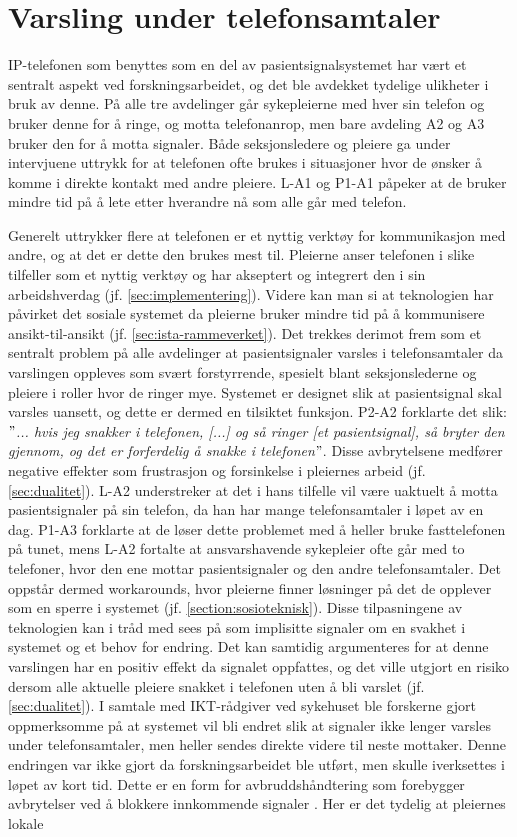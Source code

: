 \section{Varsling under telefonsamtaler}
IP-telefonen som benyttes som en del av pasientsignalsystemet har vært et sentralt aspekt ved forskningsarbeidet, og det ble avdekket tydelige ulikheter i bruk av denne. På alle tre avdelinger går sykepleierne med hver sin telefon og bruker denne for å ringe, og motta telefonanrop, men bare avdeling A2 og A3 bruker den for å motta signaler. Både seksjonsledere og pleiere ga under intervjuene uttrykk for at telefonen ofte brukes i situasjoner hvor de ønsker å komme i direkte kontakt med andre pleiere. L-A1 og P1-A1 påpeker at de bruker mindre tid på å lete etter hverandre nå som alle går med telefon.   

\noindent
Generelt uttrykker flere at telefonen er et nyttig verktøy for kommunikasjon med andre, og at det er dette den brukes mest til. Pleierne anser telefonen i slike tilfeller som et nyttig verktøy og har akseptert og integrert den i sin arbeidshverdag (jf. \ref{sec:implementering}). Videre kan man si at teknologien har påvirket det sosiale systemet da pleierne bruker mindre tid på å kommunisere ansikt-til-ansikt (jf. \ref{sec:ista-rammeverket}). Det trekkes derimot frem som et sentralt problem på alle avdelinger at pasientsignaler varsles i telefonsamtaler da varslingen oppleves som svært forstyrrende, spesielt blant seksjonslederne og pleiere i roller hvor de ringer mye. Systemet er designet slik at pasientsignal skal varsles uansett, og dette er dermed en tilsiktet funksjon. P2-A2 forklarte det slik: \textit{ $"$... hvis jeg snakker i telefonen, [...] og så ringer [et pasientsignal], så bryter den gjennom, og det er forferdelig å snakke i telefonen$"$}. Disse avbrytelsene medfører negative effekter som frustrasjon og forsinkelse i pleiernes arbeid (jf. \ref{sec:dualitet}). L-A2 understreker at det i hans tilfelle vil være uaktuelt å motta pasientsignaler på sin telefon, da han har mange telefonsamtaler i løpet av en dag. P1-A3 forklarte at de løser dette problemet med å heller bruke fasttelefonen på tunet, mens L-A2 fortalte at ansvarshavende sykepleier ofte går med to telefoner, hvor den ene mottar pasientsignaler og den andre telefonsamtaler. Det oppstår dermed workarounds, hvor pleierne finner løsninger på det de opplever som en sperre i systemet (jf. \ref{section:sosioteknisk}). Disse tilpasningene av teknologien kan i tråd med \citet{Coiera07} sees på som implisitte signaler om en svakhet i systemet og et behov for endring. Det kan samtidig argumenteres for at denne varslingen har en positiv effekt da signalet oppfattes, og det ville utgjort en risiko dersom alle aktuelle pleiere snakket i telefonen uten å bli varslet (jf. \ref{sec:dualitet}). I samtale med IKT-rådgiver ved sykehuset ble forskerne gjort oppmerksomme på at systemet vil bli endret slik at signaler ikke lenger varsles under telefonsamtaler, men heller sendes direkte videre til neste mottaker. Denne endringen var ikke gjort da forskningsarbeidet ble utført, men skulle iverksettes i løpet av kort tid. Dette er en form for avbruddshåndtering som forebygger avbrytelser ved å blokkere innkommende signaler \citep{Grandhi10}. Her er det tydelig at pleiernes lokale 